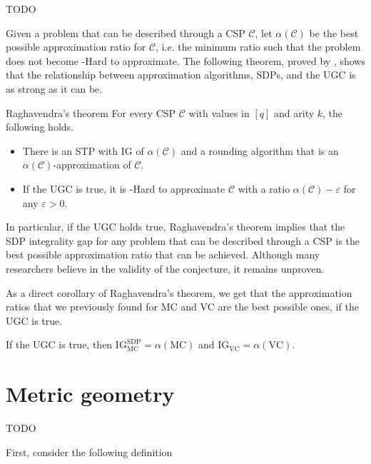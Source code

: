 \documentclass[a4paper, 12pt]{report}
\begin{document}
    TODO 
    
    Given a problem that can be described through a CSP $\mathcal C$, let $\alpha(\mathcal C)$ be the best possible approximation ratio for $\mathcal C$, i.e. the minimum ratio such that the problem does not become \NPclass-Hard to approximate. The following theorem, proved by \textcite{raghavendra}, shows that the relationship between approximation algorithms, SDPs, and the UGC is as strong as it can be.

    \begin{framedthm}{Raghavendra's theorem}
        For every CSP $\mathcal C$ with values in $[q]$ and arity $k$, the following holds.

        \begin{itemize}
            \item There is an STP with IG of $\alpha(\mathcal C)$ and a rounding algorithm that is an $\alpha(\mathcal C)$-approximation of $\mathcal C$.
            \item If the UGC is true, it is \NPclass-Hard to approximate $\mathcal C$ with a ratio $\alpha(\mathcal C) - \varepsilon$ for any $\varepsilon > 0$.
        \end{itemize}
    \end{framedthm}

    In particular, if the UGC holds true, Raghavendra's theorem implies that the SDP integrality gap for any problem that can be described through a CSP is the best possible approximation ratio that can be achieved. Although many researchers believe in the validity of the conjecture, it remains unproven.

    As a direct corollary of Raghavendra's theorem, we get that the approximation ratios that we previously found for MC and VC are the best possible ones, if the UGC is true.

    \begin{framedcor}{}
        If the UGC is true, then $\mathrm{IG}_{\mathrm{MC}}^{\mathrm{SDP}} = \alpha(\mathrm{MC})$ and $\mathrm{IG}_\mathrm{VC} = \alpha(\mathrm{VC})$.
    \end{framedcor}

    \chapter{Metric geometry}

    TODO 

    First, consider the following definition
\end{document}
